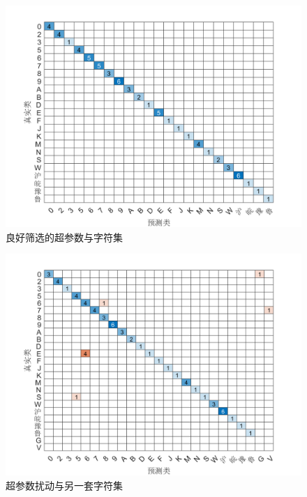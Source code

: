\documentclass[utf8,a4paper]{ctexart}
\begin{document}
\begin{minipage}{0.44\linewidth}
    \begin{figure}[H]
        \center
        \includegraphics[width=\linewidth]{./img/confusionchart1.png}
        \caption{良好筛选的超参数与字符集}
        \label{fig:c1}
    \end{figure}
\end{minipage}
\hfill
\begin{minipage}{0.44\linewidth}
    \begin{figure}[H]
        \center
        \includegraphics[width=\linewidth]{./img/confusionchart2.png}
        \caption{超参数扰动与另一套字符集}
        \label{fig:c2}
    \end{figure}
\end{minipage}
\par
\end{document}

